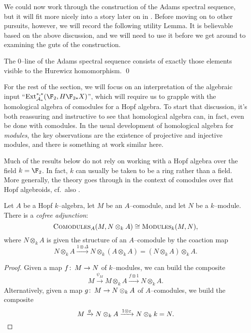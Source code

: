 We could now work through the construction of the Adams spectral sequence, but it will fit more nicely into a story later on in .  Before moving on to other pursuits, however, we will record the following utility Lemma.  It is believable based on the above discussion, and we will need to use it before we get around to examining the guts of the construction.
\begin{lemma}\label{HurewiczImageOnZeroLine}
The \(0\)--line of the Adams spectral sequence consists of exactly those elements visible to the Hurewicz homomorphism. \qed
\end{lemma}

For the rest of the section, we will focus on an interpretation of the algebraic input ``\(\Ext_{\mathcal A_*}^{*, *}(\F_2, H\F_{2*} X)\)'', which will require us to grapple with the homological algebra of comodules for a Hopf algebra.  To start that discussion, it's both reassuring and instructive to see that homological algebra can, in fact, even be done with comodules.  In the usual development of homological algebra for \emph{modules}, the key observations are the existence of projective and injective modules, and there is something at work similar here.

\begin{remark}
Much of the results below do not rely on working with a Hopf algebra over the field \(k = \F_2\).  In fact, \(k\) can usually be taken to be a ring rather than a field. More generally, the theory goes through in the context of comodules over flat Hopf algebroids, cf.\ also .
\end{remark}

\begin{lemma}\label{CofreeComoduleAdjunction}
Let \(A\) be a Hopf \(k\)--algebra, let \(M\) be an \(A\)--comodule, and let \(N\) be a \(k\)--module.  There is a \textit{cofree adjunction}: \[\normalfont\textsc{Comodules}_A(M, N \otimes_k A) \cong \normalfont\textsc{Modules}_k(M, N),\] where \(N \otimes_k A\) is given the structure of an \(A\)--comodule by the coaction map \[N \otimes_k A \xrightarrow{1 \otimes \Delta} N \otimes_k (A \otimes_k A) = (N \otimes_k A) \otimes_k A.\]
\end{lemma}
\begin{proof}
Given a map \(f\colon\thinspace M \to N\) of \(k\)--modules, we can build the composite \[M \xrightarrow{\psi_M} M \otimes_k A \xrightarrow{f \otimes 1} N \otimes_k A.\]  Alternatively, given a map \(g\colon\thinspace M \to N \otimes_k A\) of \(A\)--comodules, we build the composite \[M \xrightarrow{g} N \otimes_k A \xrightarrow{1 \otimes \varepsilon} N \otimes_k k = N. \qedhere\]
\end{proof}

